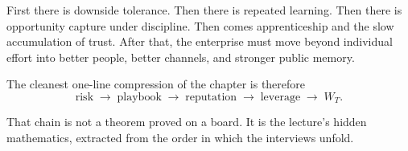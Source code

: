 First there is downside tolerance. Then there is repeated learning. Then there is opportunity capture under discipline. Then comes apprenticeship and the slow accumulation of trust. After that, the enterprise must move beyond individual effort into better people, better channels, and stronger public memory.

The cleanest one-line compression of the chapter is therefore
\begin{equation}
\mbox{risk} \;\rightarrow\; \mbox{playbook} \;\rightarrow\; \mbox{reputation} \;\rightarrow\; \mbox{leverage} \;\rightarrow\; W_T.
\end{equation}

That chain is not a theorem proved on a board. It is the lecture's hidden mathematics, extracted from the order in which the interviews unfold.